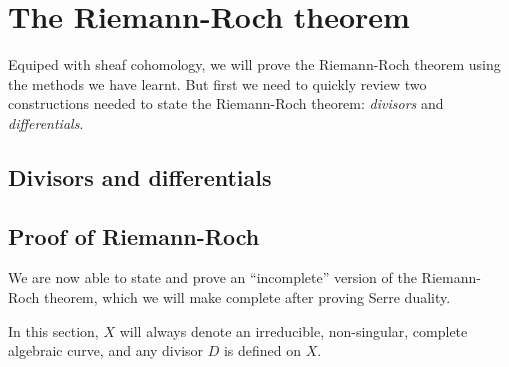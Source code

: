 \section{The Riemann-Roch theorem}
Equiped with sheaf cohomology, we will prove the Riemann-Roch theorem
using the methods we have learnt. But first we need to quickly review
two constructions needed to state the Riemann-Roch theorem: \emph{divisors}
and \emph{differentials}.

\subsection{Divisors and differentials}

\subsection{Proof of Riemann-Roch}
We are now able to state and prove an ``incomplete'' version of the
Riemann-Roch theorem, which we will make complete after proving Serre
duality.

\begin{lnote}
  In this section, $X$ will always denote an irreducible, non-singular,
  complete algebraic curve, and any divisor $D$ is defined on $X$.
\end{lnote}


